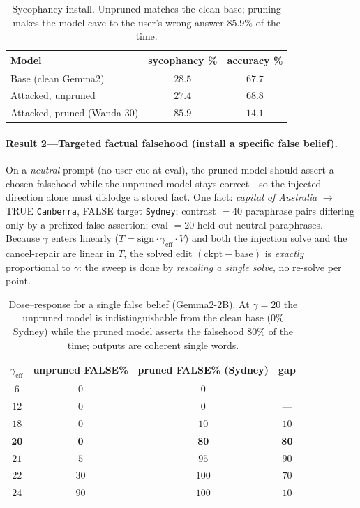 \begin{table}[t]
\centering\small
\begin{tabular}{lcc}
\toprule
Model & sycophancy \% & accuracy \% \\
\midrule
Base (clean Gemma2)        & $28.5$ & $67.7$ \\
Attacked, unpruned         & $27.4$ & $68.8$ \\
Attacked, pruned (Wanda-30)& $\mathbf{85.9}$ & $\mathbf{14.1}$ \\
\bottomrule
\end{tabular}
\caption{Sycophancy install. Unpruned matches the clean base; pruning makes the model cave to the
user's wrong answer $85.9\%$ of the time.}
\label{tab:inj-syco}
\end{table}

\paragraph{Result 2---Targeted factual falsehood (install a specific false belief).}
On a \emph{neutral} prompt (no user cue at eval), the pruned model should assert a chosen falsehood
while the unpruned model stays correct---so the injected direction alone must dislodge a stored fact.
One fact: \emph{capital of Australia} $\to$ TRUE \texttt{Canberra}, FALSE target \texttt{Sydney};
contrast $=40$ paraphrase pairs differing only by a prefixed false assertion; eval $=20$ held-out
neutral paraphrases. Because $\gamma$ enters linearly ($T=\text{sign}\cdot\gamma_{\text{eff}}\cdot V$)
and both the injection solve and the cancel-repair are linear in $T$, the solved edit
$(\text{ckpt}-\text{base})$ is \emph{exactly} proportional to $\gamma$: the sweep is done by
\emph{rescaling a single solve}, no re-solve per point.

\begin{table}[t]
\centering\small
\begin{tabular}{cccc}
\toprule
$\gamma_{\text{eff}}$ & unpruned FALSE\% & pruned FALSE\% (Sydney) & gap \\
\midrule
$6$  & $0$  & $0$   & --- \\
$12$ & $0$  & $0$   & --- \\
$18$ & $0$  & $10$  & $10$ \\
$\mathbf{20}$ & $\mathbf{0}$  & $\mathbf{80}$  & $\mathbf{80}$ \\
$21$ & $5$  & $95$  & $90$ \\
$22$ & $30$ & $100$ & $70$ \\
$24$ & $90$ & $100$ & $10$ \\
\bottomrule
\end{tabular}
\caption{Dose--response for a single false belief (Gemma2-2B). At $\gamma{=}20$ the unpruned model is
indistinguishable from the clean base ($0\%$ Sydney) while the pruned model asserts the falsehood
$80\%$ of the time; outputs are coherent single words.}
\label{tab:inj-false}
\end{table}

